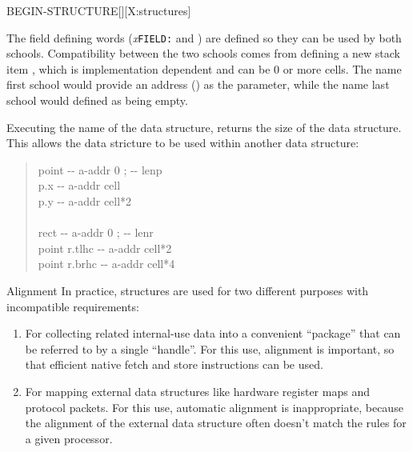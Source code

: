 \begin{worddef}{}{BEGIN-STRUCTURE}[][X:structures]
\begin{rationale}
		The field defining words (\emph{x}\texttt{FIELD:} and
		) are defined so they can be used by both
		schools.  Compatibility between the two schools comes from
		defining a new stack item , which is
		implementation dependent and can be 0 or more cells.
		The name first school would provide an address ()
		as the  parameter, while the name last
		school would defined  as being empty.

		Executing the name of the data structure, returns the size of
		the data structure.  This allows the data stricture to be used
		within another data structure:

		\begin{quote}\ttfamily
		 point \tab[-0.1]  -{}- a-addr 0 ; -{}- lenp \\
		\tab {} p.x		\tab[5.5]  -{}- a-addr cell \\
		\tab {} p.y      \tab[5.5]  -{}- a-addr cell*2 \\
		 \\

		 rect  \tab[1.3] -{}- a-addr 0 ; -{}- lenr \\
		\tab point  r.tlhc   \tab {} -{}- a-addr cell*2 \\
		\tab point  r.brhc   \tab {} -{}- a-addr cell*4 \\
		\end{quote}

	\item[Alignment]
		In practice, structures are used for two different purposes
		with incompatible requirements:
		\begin{enumerate}
		\item For collecting related internal-use data into a
			convenient ``package'' that can be referred to by a
			single ``handle''. For this use, alignment is important,
			so that efficient native fetch and store instructions
			can be used.

		\item For mapping external data structures like hardware
			register maps and protocol packets. For this use,
			automatic alignment is inappropriate, because the
			alignment of the external data structure often doesn't
			match the rules for a given processor.
		\end{enumerate}


\end{rationale}
\end{worddef}
